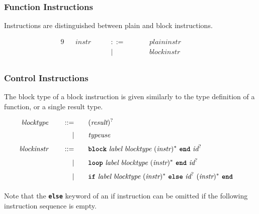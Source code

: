 
\subsubsection{Function Instructions}

Instructions are distinguished between plain and block instructions.

\begin{alignat*}{9}
    && \textit{instr}\ &&\quad ::= &\quad && \textit{plaininstr}\ \quad &&  \\[1mm]
    &&       &&\quad | &\quad && \textit{blockinstr}\ \quad &&  \\[1mm]
\end{alignat*}

\subsubsection{Control Instructions}

The block type of a block instruction is given similarly to the type definition of a function, or a single result type.

\begin{alignat*}{9}
    && \textit{blocktype}\ &&\quad ::= &\quad && (\textit{result})^?\ \quad &&  \\[1mm]
    &&       &&\quad | &\quad && \textit{typeuse}\ \quad &&  \\[1mm]
    && \textit{blockinstr}\ &&\quad ::= &\quad && \textbf{\texttt{block}}\ \textit{label}\ \textit{blocktype}\ (\textit{instr})^*\ \textbf{\texttt{end}}\ \textit{id}^?\ \quad &&  \\[1mm]
    && &&\quad | &\quad && \textbf{\texttt{loop}}\ \textit{label}\ \textit{blocktype}\ (\textit{instr})^*\ \textbf{\texttt{end}}\ \textit{id}^?\ \quad &&  \\[1mm]
    && &&\quad | &\quad && \textbf{\texttt{if}}\ \textit{label}\ \textit{blocktype}\ (\textit{instr})^*\ \textbf{\texttt{else}}\ \textit{id}^?\ (\textit{instr})^*\ \textbf{\texttt{end}}\ \quad &&  \\[1mm]
\end{alignat*}

Note that the \textbf{\texttt{else}} keyword of an if instruction can be omitted if the following instruction sequence is empty.

